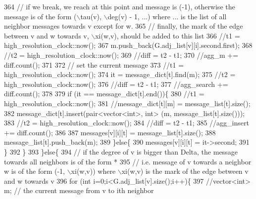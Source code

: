 \begin{DoxyCode}
364 \textcolor{comment}{          // if we break, we reach at this point and message is (-1), otherwise the message is of the form
       (\(\backslash\)tau(v), \(\backslash\)deg(v) - 1, ...) where ... is the list of all neighbor messages towards v except for w. }
365 \textcolor{comment}{          // finally, the mark of the edge between v and w towards v, \(\backslash\)xi(w,v), should be added to this
       list}
366 \textcolor{comment}{          //t1 = high\_resolution\_clock::now();}
367 \textcolor{comment}{          m.push\_back(G.adj\_list[v][i].second.first);}
368 \textcolor{comment}{          //t2 = high\_resolution\_clock::now();}
369 \textcolor{comment}{          //diff = t2 - t1;}
370 \textcolor{comment}{          //agg\_m += diff.count();}
371 \textcolor{comment}{}
372 \textcolor{comment}{          // set the current message}
373 \textcolor{comment}{          //t1 = high\_resolution\_clock::now();}
374 \textcolor{comment}{          it = message\_dict[t].find(m);}
375 \textcolor{comment}{          //t2 = high\_resolution\_clock::now();}
376 \textcolor{comment}{          //diff = t2 - t1;}
377 \textcolor{comment}{          //agg\_search += diff.count();}
378 \textcolor{comment}{}
379 \textcolor{comment}{          if (it == message\_dict[t].end())\{}
380 \textcolor{comment}{            //t1 = high\_resolution\_clock::now();}
381 \textcolor{comment}{            //message\_dict[t][m] = message\_list[t].size();}
382 \textcolor{comment}{            message\_dict[t].insert(pair<vector<int>, int> (m, message\_list[t].size()));}
383 \textcolor{comment}{            //t2 = high\_resolution\_clock::now();}
384 \textcolor{comment}{            //diff = t2 - t1;}
385 \textcolor{comment}{            //agg\_insert += diff.count();}
386 \textcolor{comment}{}
387 \textcolor{comment}{            messages[v][i][t] = message\_list[t].size();}
388 \textcolor{comment}{            message\_list[t].push\_back(m);}
389 \textcolor{comment}{          \}else\{}
390 \textcolor{comment}{            messages[v][i][t] = it->second;}
391 \textcolor{comment}{          \}}
392 \textcolor{comment}{        \}}
393 \textcolor{comment}{      \}else\{}
394 \textcolor{comment}{        // if the degree of v is bigger than Delta, the message towards all neighbors is of the form *}
395 \textcolor{comment}{        // i.e. message of v towards a neighbor w is of the form (-1, \(\backslash\)xi(w,v)) where \(\backslash\)xi(w,v) is the mark
       of the edge between v and w towards v}
396 \textcolor{comment}{        for (int i=0;i<G.adj\_list[v].size();i++)\{}
397 \textcolor{comment}{          //vector<int> m; // the current message from v to ith neighbor}

\end{DoxyCode}
